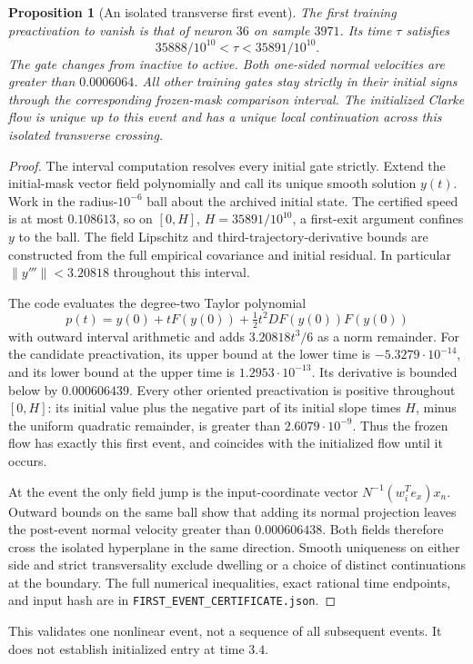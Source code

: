 \documentclass[10pt]{article}
\newtheorem{proposition}[theorem]{Proposition}
\begin{document}
\begin{proposition}[An isolated transverse first event]
The first training preactivation to vanish is that of neuron $36$ on
sample $3971$. Its time $\tau$ satisfies
\[
 35888/10^{10}<\tau<35891/10^{10}.
\]
The gate changes from inactive to active. Both one-sided normal velocities
are greater than $0.0006064$. All other training gates stay strictly in
their initial signs through the corresponding frozen-mask comparison interval.
The initialized Clarke flow is unique up to this event and has a unique
local continuation across this isolated transverse crossing.
\end{proposition}
\begin{proof}
The interval computation resolves every initial gate strictly. Extend the
initial-mask vector field polynomially and call its unique smooth solution
$y(t)$. Work in the radius-$10^{-6}$ ball about the archived initial state.
The certified speed is at most $0.108613$, so on
$[0,H]$, $H=35891/10^{10}$, a first-exit argument confines $y$ to the ball.
The field Lipschitz and third-trajectory-derivative bounds are constructed
from the full empirical covariance and initial residual. In particular
$\|y'''\|<3.20818$ throughout this interval.

The code evaluates the degree-two Taylor polynomial
\[
 p(t)=y(0)+tF(y(0))+\tfrac12t^2DF(y(0))F(y(0))
\]
with outward interval arithmetic and adds $3.20818t^3/6$ as a norm
remainder. For the candidate preactivation, its upper bound at the lower
time is $-5.3279\cdot10^{-14}$, and its lower bound at the upper time is
$1.2953\cdot10^{-13}$. Its derivative is bounded below by $0.000606439$.
Every other oriented preactivation is positive throughout $[0,H]$:
its initial value plus the negative part of its initial slope times $H$,
minus the uniform quadratic remainder, is greater than
$2.6079\cdot10^{-9}$. Thus the frozen flow has exactly this first event,
and coincides with the initialized flow until it occurs.

At the event the only field jump is the input-coordinate vector
$N^{-1}(w_i^Te_x)x_n$. Outward bounds on the same ball show that adding
its normal projection leaves the post-event normal velocity greater than
$0.000606438$. Both fields therefore cross the isolated hyperplane in the
same direction. Smooth uniqueness on either side and strict transversality
exclude dwelling or a choice of distinct continuations at the boundary.
The full numerical inequalities, exact rational time endpoints, and input
hash are in \texttt{FIRST\_EVENT\_CERTIFICATE.json}.
\end{proof}
This validates one nonlinear event, not a sequence of all subsequent events.
It does not establish initialized entry at time $3.4$.
\end{document}
